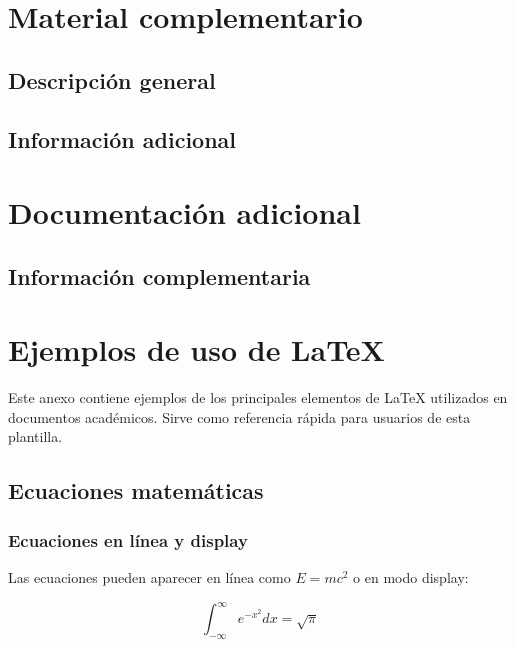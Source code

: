 \documentclass[a4paper,11pt]{report}
\begin{document}
\begin{appendices}

\chapter{Material complementario}

\lipsum[24]

\section{Descripción general}

\lipsum[25]

\section{Información adicional}

\lipsum[26]

\chapter{Documentación adicional}

\lipsum[27]

\section{Información complementaria}

\lipsum[28]

\chapter{Ejemplos de uso de \LaTeX}
\label{app:latex}

Este anexo contiene ejemplos de los principales elementos de \LaTeX{} utilizados en documentos académicos. Sirve como referencia rápida para usuarios de esta plantilla.

\section{Ecuaciones matemáticas}

\subsection{Ecuaciones en línea y display}

Las ecuaciones pueden aparecer en línea como $E = mc^2$ o en modo display:

\[
\int_{-\infty}^{\infty} e^{-x^2} dx = \sqrt{\pi}
\]


\end{appendices}
\end{document}
